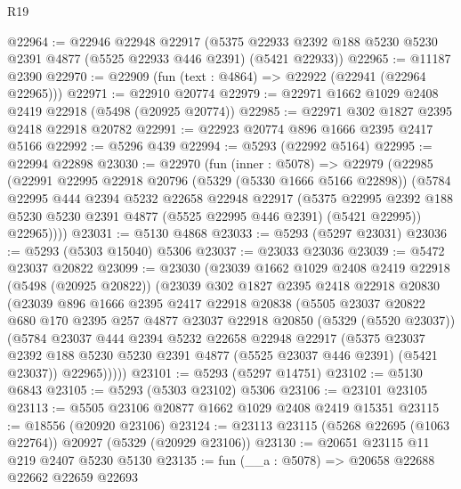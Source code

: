 \begin{lexlean}{R19}
\begin{coremodule}
@22964 := @22946
    @22948
    @22917
    (@5375 @22933 @2392 @188 @5230 @5230 @2391 @4877 (@5525 @22933 @446 @2391) (@5421 @22933))
@22965 := @11187 @2390
@22970 := @22909 (fun (text : @4864) => @22922 (@22941 (@22964 @22965)))
@22971 := @22910 @20774
@22979 := @22971 @1662 @1029 @2408 @2419 @22918 (@5498 (@20925 @20774))
@22985 := @22971 @302 @1827 @2395 @2418 @22918 @20782
@22991 := @22923 @20774 @896 @1666 @2395 @2417 @5166
@22992 := @5296 @439
@22994 := @5293 (@22992 @5164)
@22995 := @22994 @22898
@23030 := @22970
    (fun (inner : @5078) =>
    @22979
      (@22985
        (@22991
          @22995
          @22918
          @20796
          (@5329 (@5330 @1666 @5166 @22898))
          (@5784
            @22995
            @444
            @2394
            @5232
            @22658
            @22948
            @22917
            (@5375
              @22995
              @2392
              @188
              @5230
              @5230
              @2391
              @4877
              (@5525 @22995 @446 @2391)
              (@5421 @22995))
            @22965))))
@23031 := @5130 @4868
@23033 := @5293 (@5297 @23031)
@23036 := @5293 (@5303 @15040) @5306
@23037 := @23033 @23036
@23039 := @5472 @23037 @20822
@23099 := @23030
    (@23039
      @1662
      @1029
      @2408
      @2419
      @22918
      (@5498 (@20925 @20822))
      (@23039
        @302
        @1827
        @2395
        @2418
        @22918
        @20830
        (@23039
          @896
          @1666
          @2395
          @2417
          @22918
          @20838
          (@5505
            @23037
            @20822
            @680
            @170
            @2395
            @257
            @4877
            @23037
            @22918
            @20850
            (@5329 (@5520 @23037))
            (@5784
              @23037
              @444
              @2394
              @5232
              @22658
              @22948
              @22917
              (@5375
                @23037
                @2392
                @188
                @5230
                @5230
                @2391
                @4877
                (@5525 @23037 @446 @2391)
                (@5421 @23037))
              @22965)))))
@23101 := @5293 (@5297 @14751)
@23102 := @5130 @6843
@23105 := @5293 (@5303 @23102) @5306
@23106 := @23101 @23105
@23113 := @5505 @23106 @20877 @1662 @1029 @2408 @2419 @15351
@23115 := @18556 (@20920 @23106)
@23124 := @23113 @23115 (@5268 @22695 (@1063 @22764)) @20927 (@5329 (@20929 @23106))
@23130 := @20651 @23115 @11 @219 @2407 @5230 @5130
@23135 := fun (__a : @5078) => @20658 @22688 @22662 @22659 @22693

\end{coremodule}
\end{lexlean}
